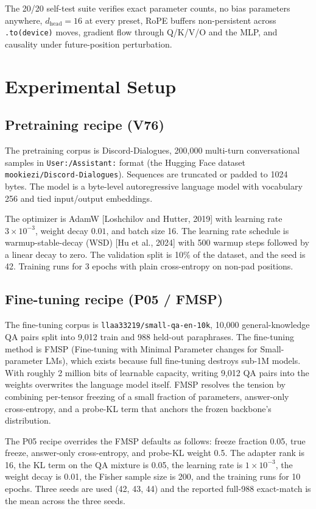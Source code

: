 \documentclass[11pt]{article}
\begin{document}
The 20/20 self-test suite verifies exact parameter counts, no bias parameters anywhere, $d_{\text{head}} = 16$ at every preset, RoPE buffers non-persistent across \texttt{.to(device)} moves, gradient flow through Q/K/V/O and the MLP, and causality under future-position perturbation.

\section{Experimental Setup}

\subsection{Pretraining recipe (V76)}

The pretraining corpus is Discord-Dialogues, 200,000 multi-turn conversational samples in \texttt{User:/Assistant:} format (the Hugging Face dataset \texttt{mookiezi/Discord-Dialogues}). Sequences are truncated or padded to 1024 bytes. The model is a byte-level autoregressive language model with vocabulary 256 and tied input/output embeddings.

The optimizer is AdamW [Loshchilov and Hutter, 2019] with learning rate $3 \times 10^{-3}$, weight decay $0.01$, and batch size 16. The learning rate schedule is warmup-stable-decay (WSD) [Hu et al., 2024] with 500 warmup steps followed by a linear decay to zero. The validation split is 10\% of the dataset, and the seed is 42. Training runs for 3 epochs with plain cross-entropy on non-pad positions.

\subsection{Fine-tuning recipe (P05 / FMSP)}

The fine-tuning corpus is \texttt{llaa33219/small-qa-en-10k}, 10,000 general-knowledge QA pairs split into 9,012 train and 988 held-out paraphrases. The fine-tuning method is FMSP (Fine-tuning with Minimal Parameter changes for Small-parameter LMs), which exists because full fine-tuning destroys sub-1M models. With roughly 2 million bits of learnable capacity, writing 9,012 QA pairs into the weights overwrites the language model itself. FMSP resolves the tension by combining per-tensor freezing of a small fraction of parameters, answer-only cross-entropy, and a probe-KL term that anchors the frozen backbone's distribution.

The P05 recipe overrides the FMSP defaults as follows: freeze fraction 0.05, true freeze, answer-only cross-entropy, and probe-KL weight 0.5. The adapter rank is 16, the KL term on the QA mixture is 0.05, the learning rate is $1 \times 10^{-3}$, the weight decay is 0.01, the Fisher sample size is 200, and the training runs for 10 epochs. Three seeds are used (42, 43, 44) and the reported full-988 exact-match is the mean across the three seeds.
\end{document}
